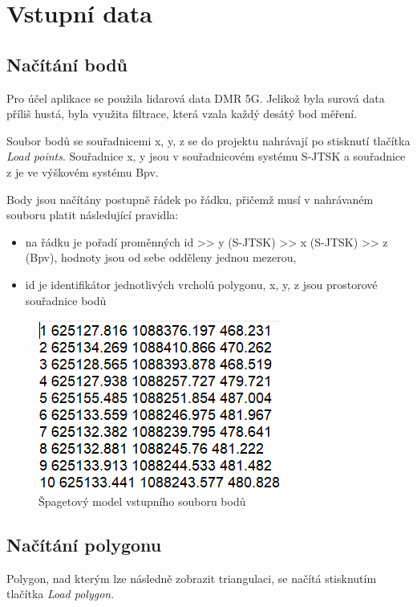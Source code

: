 \documentclass[11pt]{article}
\begin{document}
\section{Vstupní data}
\subsection{Načítání bodů}

Pro účel aplikace se použila lidarová data DMR 5G. Jelikož byla surová data příliš hustá, byla využita filtrace, která vzala každý desátý bod měření. 

Soubor bodů se souřadnicemi x, y, z se do projektu nahrávají po stisknutí  tlačítka \textit{Load points}. Souřadnice x, y jsou v  souřadnicovém systému S-JTSK a souřadnice z je ve výškovém systému Bpv.

Body jsou načítány postupně řádek po řádku, přičemž musí v nahrávaném souboru platit následující pravidla:    

\begin{itemize}
\item na řádku je pořadí proměnných id >> y (S-JTSK) >> x (S-JTSK)  >> z (Bpv),  hodnoty jsou od sebe odděleny  jednou mezerou,
\item id je identifikátor jednotlivých vrcholů polygonu, x, y, z jsou prostorové souřadnice bodů

\end{itemize}

\begin{figure}[htbh]
	\centering	
	\includegraphics[scale=1]{images/vstup.png} 
	\caption{Špagetový model vstupního souboru bodů}
	\label{fig:vstup.}
\end{figure} 

\subsection{Načítání polygonu}
Polygon, nad kterým lze následně zobrazit triangulaci, se načítá stisknutím tlačítka \textit{Load polygon}.
\end{document}
